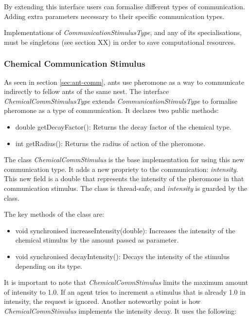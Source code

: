 By extending this interface users can formalise different types of communication. Adding extra parameters necessary to their specific communication types.

Implementations of \emph{CommunicationStimulusType}, and any of its specialisations, must be singletons (see section XX) in order to save computational resources.

\subsubsection{Chemical Communication Stimulus}
\label{subsec:chemical-stimulus}

As seen in section \ref{sec:ant-comm}, ants use pheromone as a way to communicate indirectly to fellow ants of the same nest. The interface \emph{ChemicalCommStimulusType} extends \emph{CommunicationStimulsType} to formalise pheromone as a type of communication. It declares two public methods:

\begin{itemize}
  \item double getDecayFactor(): Returns the decay factor of the chemical type. 
  \item int getRadius(): Returns the radius of action of the pheromone.
\end{itemize}

The class \emph{ChemicalCommStimulus} is the base implementation for using this new communication type. It adds a new propriety to the communication: \emph{intensity}. This new field is a double that represents the intensity of the pheromone in that communication stimulus. The class is thread-safe, and \emph{intensity} is guarded by the class.

The key methods of the class are:

\begin{itemize}
  \item void synchronised increaseIntensity(double): Increases the intensity of the chemical stimulus by the amount passed as parameter.
  
  \item void synchronised decayIntensity(): Decays the intensity of the stimulus depending on its type.
\end{itemize}

It is important to note that \emph{ChemicalCommStimulus} limits the maximum amount of intensity to 1.0. If an agent tries to increment a stimulus that is already 1.0 in intensity, the request is ignored.
Another noteworthy point is how \emph{ChemicalCommStimulus} implements the intensity decay. It uses the following:

